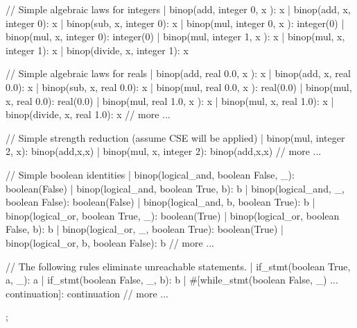 \begin{prop}
{// Simple algebraic laws for integers
|  binop(add, integer 0, x        ):  x
|  binop(add, x,         integer 0):  x
|  binop(sub, x,         integer 0):  x
|  binop(mul, integer 0, x        ):  integer(0)
|  binop(mul, x,         integer 0):  integer(0)
|  binop(mul, integer 1, x        ):  x
|  binop(mul, x,         integer 1):  x
|  binop(divide, x,      integer 1):  x

// Simple algebraic laws for reals
|  binop(add, real 0.0, x        ):  x
|  binop(add, x,         real 0.0):  x
|  binop(sub, x,         real 0.0):  x
|  binop(mul, real 0.0, x        ):  real(0.0)
|  binop(mul, x,         real 0.0):  real(0.0)
|  binop(mul, real 1.0, x        ):  x
|  binop(mul, x,         real 1.0):  x
|  binop(divide, x,      real 1.0):  x
// more ...

// Simple strength reduction (assume CSE will be applied)
|  binop(mul, integer 2, x):  binop(add,x,x)
|  binop(mul, x, integer 2):  binop(add,x,x)
// more ...

// Simple boolean identities
|  binop(logical_and, boolean False, _): boolean(False)
|  binop(logical_and, boolean True, b):  b
|  binop(logical_and, _, boolean False): boolean(False)
|  binop(logical_and, b, boolean True):  b
|  binop(logical_or,  boolean True, _):  boolean(True)
|  binop(logical_or,  boolean False, b): b
|  binop(logical_or,  _, boolean True):  boolean(True)
|  binop(logical_or,  b, boolean False): b
// more ...

// The following rules eliminate unreachable statements. 
|  if_stmt(boolean True, a, _):          a
|  if_stmt(boolean False, _, b):         b
|  #[while_stmt(boolean False, _) ... continuation]: continuation
// more ...
};
\end{prop}

